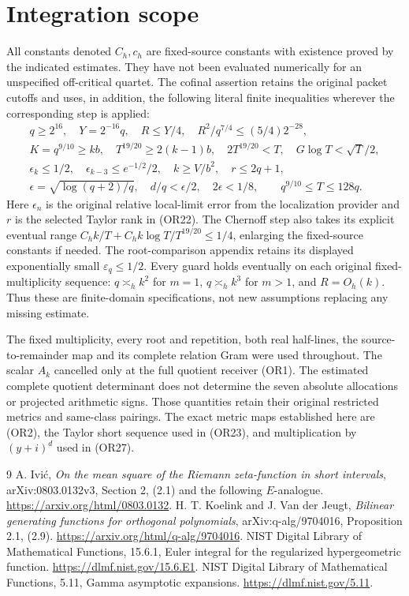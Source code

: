 \documentclass[11pt]{article}
\begin{document}
\section{Integration scope}
All constants denoted \(C_h,c_h\) are fixed-source constants with
existence proved by the indicated estimates.  They have not been
evaluated numerically for an unspecified off-critical quartet.
The cofinal assertion retains the original packet cutoffs and uses,
in addition, the following literal finite inequalities wherever the
corresponding step is applied:
\[
 \begin{gathered}
 q\geq2^{16},\quad Y=2^{-16}q,\quad R\leq Y/4,\quad
 R^2/q^{7/4}\leq(5/4)2^{-28},\\
 K=q^{9/10}\geq kb,\quad
 T^{19/20}\geq2(k-1)b,\quad
 2T^{19/20}<T,\quad G\log T<\sqrt T/2,\\
 \epsilon_k\leq1/2,\quad
 \epsilon_{k-3}\leq e^{-1/2}/2,\quad k\geq V/b^2,\quad
 r\leq2q+1,\\
 \epsilon=\sqrt{\log(q+2)/q},\quad
 d/q<\epsilon/2,\quad 2\epsilon<1/8 ,
 \qquad q^{9/10}\leq T\leq128q .
 \end{gathered}                                      \tag{OR41}
\]
Here \(\epsilon_n\) is the original relative local-limit error
from the localization provider and \(r\) is the selected Taylor
rank in (OR22).  The Chernoff step also takes its explicit eventual
range \(C_hk/T+C_hk\log T/T^{19/20}\leq1/4\), enlarging the
fixed-source constants if needed.  The root-comparison appendix
retains its displayed exponentially small \(\varepsilon_q\leq1/2\).
Every guard holds eventually on each original fixed-multiplicity
sequence: \(q\asymp_h k^2\) for \(m=1\), \(q\asymp_h k^3\) for
\(m>1\), and \(R=O_h(k)\).  Thus these are finite-domain
specifications, not new assumptions replacing any missing estimate.

The fixed multiplicity, every root and repetition, both real
half-lines, the source-to-remainder map and its complete relation
Gram were used throughout.  The scalar \(A_k\) cancelled only at
the full quotient receiver (OR1).  The estimated complete
quotient determinant does not determine the seven absolute
allocations or projected arithmetic signs.  Those quantities
retain their original restricted metrics and same-class pairings.
The exact metric maps established here are (OR2), the Taylor
short sequence used in (OR23), and multiplication by \((y+i)^d\)
used in (OR27).

\begin{thebibliography}{9}
 A. Ivi\'c,
\emph{On the mean square of the Riemann zeta-function in short intervals},
arXiv:0803.0132v3, Section 2, (2.1) and the following \(E\)-analogue.
\url{https://arxiv.org/html/0803.0132}.
 H. T. Koelink and J. Van der Jeugt,
\emph{Bilinear generating functions for orthogonal polynomials},
arXiv:q-alg/9704016, Proposition 2.1, (2.9).
\url{https://arxiv.org/html/q-alg/9704016}.
 NIST Digital Library of Mathematical Functions,
15.6.1, Euler integral for the regularized hypergeometric function.
\url{https://dlmf.nist.gov/15.6.E1}.
 NIST Digital Library of Mathematical Functions,
5.11, Gamma asymptotic expansions.
\url{https://dlmf.nist.gov/5.11}.
\end{thebibliography}
\end{document}
